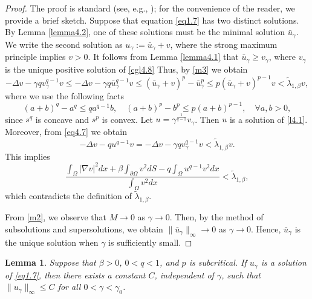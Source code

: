 \documentclass[12pt,reqno]{amsart}
\numberwithin{equation}{section}
\newtheorem{lemma}[theorem]{Lemma}
\theoremstyle{definition}
\begin{document}
\begin{proof}
The proof is standard (see, e.g., \cite{ABC}); for the convenience of the reader, we provide a brief sketch. Suppose that equation \eqref{eq1.7} has two distinct solutions. 
By Lemma \ref{lemma4.2}, one of these solutions must be the minimal solution $\bar{u}_\gamma$. We write the second solution as $u_\gamma:=\bar{u}_\gamma+v$, where the strong maximum principle implies $v>0$. It follows from Lemma \ref{lemma4.1} that  $\bar{u}_\gamma\ge v_\gamma$, where $v_\gamma$ is the unique positive solution of \eqref{cgl4.8} Thus, by \eqref{m3} we obtain
\begin{equation}\label{eq4.7}
-\Delta v- \gamma qv_\gamma^{q-1}v\le -\Delta v-\gamma q\bar{u}_\gamma^{q-1}v\le (\bar{u}_\gamma+v)^p-\bar{u}_\gamma^p\le p(\bar{u}_\gamma+v)^{p-1}v<\tilde{\lambda}_{1,\beta}v,
\end{equation}
where we use the following facts
$$
(a+b)^q-a^q\le qa^{q-1}b, \quad (a+b)^p-b^p\le p(a+b)^{p-1},\quad \forall a,b>0,
$$
since $s^q$ is concave and $s^p$ is convex.
Let $u=\gamma^{\frac{1}{q-1}}v_\gamma$. Then $u$ is a solution of \eqref{l4.1}. Moreover, from \eqref{eq4.7} we obtain 
$$
-\Delta v-qu^{q-1}v=-\Delta v- \gamma qv_\gamma^{q-1}v<\tilde{\lambda}_{1,\beta}v.
$$
This implies 
$$
\frac{\int_{\Omega}|\nabla v|^2dx+\beta\int_{\partial \Omega}v^2dS-q\int_{\Omega}u^{q-1}v^2dx}{\int_{\Omega}v^2dx}<\tilde{\lambda}_{1,\beta},
$$
which contradicts the definition of $\tilde{\lambda}_{1,\beta}$.

From  \eqref{m2}, we observe that $M\to 0$ as $\gamma\to 0$. Then, by the method of subsolutions and supersolutions, we obtain $\|\bar{u}_\gamma\|_\infty\to 0$ as $\gamma\to 0$. Hence, $\bar{u}_\gamma$ is the unique solution when $\gamma$ is sufficiently small. 
\end{proof}


\begin{lemma}\label{lemma4.4}
Suppose that $\beta>0$, $0<q<1$, and $p$ is subcritical. If $u_\gamma$ is a solution of \eqref{eq1.7}, then there exists a constant $C$, independent of $\gamma$, such that $\|u_\gamma\|_\infty\le C$ for all $0<\gamma<\gamma_0$.
\end{lemma}
\end{document}
